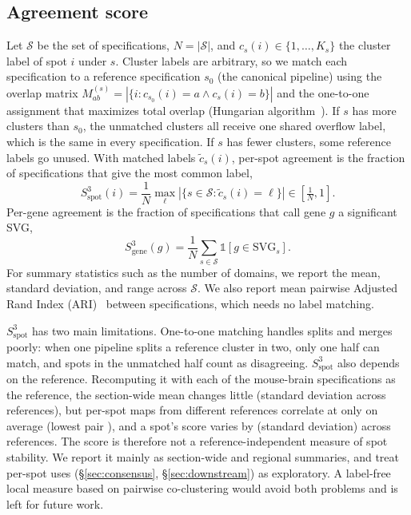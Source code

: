 \documentclass[conference]{IEEEtran}
\begin{document}
\subsection{Agreement score}
\label{sec:s3}
Let $\mathcal{S}$ be the set of specifications, $N=|\mathcal{S}|$, and
$c_s(i)\in\{1,\dots,K_s\}$ the cluster label of spot $i$ under $s$. Cluster
labels are arbitrary, so we match each specification to a reference
specification $s_0$ (the canonical pipeline) using the overlap matrix
$M^{(s)}_{ab}=|\{i: c_{s_0}(i)=a \wedge c_s(i)=b\}|$ and the one-to-one
assignment that maximizes total overlap (Hungarian
algorithm~\cite{kuhn1955hungarian}). If $s$ has more clusters than $s_0$,
the unmatched clusters all receive one shared overflow label, which is the
same in every specification. If $s$ has fewer clusters, some reference
labels go unused. With matched labels $\tilde c_s(i)$, per-spot agreement
is the fraction of specifications that give the most common label,
\begin{equation}
  S^3_{\text{spot}}(i) = \frac{1}{N}\max_{\ell}\left|\{s\in\mathcal{S}:\tilde
  c_s(i)=\ell\}\right| \in \left[\tfrac1N,1\right].
\end{equation}
Per-gene agreement is the fraction of specifications that call gene $g$ a
significant SVG,
\begin{equation}
  S^3_{\text{gene}}(g) = \frac1N\sum_{s\in\mathcal{S}} \mathbb{1}[g\in\text{SVG}_s].
  \label{eq:s3gene}
\end{equation}
For summary statistics such as the number of domains, we report the mean,
standard deviation, and range across $\mathcal{S}$. We also report mean
pairwise Adjusted Rand Index (ARI)~\cite{hubert1985comparing} between
specifications, which needs no label matching.

$S^3_{\text{spot}}$ has two main limitations. One-to-one matching handles
splits and merges poorly: when one pipeline splits a reference cluster in
two, only one half can match, and spots in the unmatched half count as
disagreeing. $S^3_{\text{spot}}$
also depends on the reference. Recomputing it with each of the
\RefRobustN{} mouse-brain specifications as the reference, the
section-wide mean changes little (standard deviation
\RefRobustAggMeanStd{} across references), but per-spot maps from different
references correlate at only \RefRobustMeanPearson{} on average (lowest
pair \RefRobustMinPearson{}), and a spot's score varies by
\RefRobustMeanPerSpotStd{} (standard deviation) across references. The
score is therefore not a reference-independent measure of spot stability.
We report it mainly as section-wide and regional summaries, and treat
per-spot uses (\S\ref{sec:consensus}, \S\ref{sec:downstream}) as
exploratory. A label-free local measure based on pairwise co-clustering
would avoid both problems and is left for future work.
\end{document}
